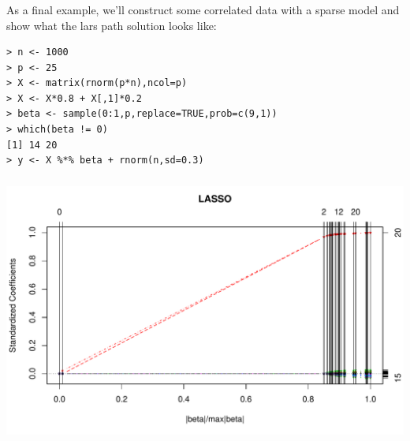 \begin{frame}[fragile] \frametitle{}

As a final example, we'll construct some correlated data with a
sparse model and show what the lars path solution looks like:
\begin{verbatim}
> n <- 1000
> p <- 25
> X <- matrix(rnorm(p*n),ncol=p)
> X <- X*0.8 + X[,1]*0.2
> beta <- sample(0:1,p,replace=TRUE,prob=c(9,1))
> which(beta != 0)
[1] 14 20
> y <- X %*% beta + rnorm(n,sd=0.3)
\end{verbatim}

\end{frame}

\begin{frame}[fragile] \frametitle{}

\begin{center}
\includegraphics[width=\textwidth]{img/fig07.pdf}
\end{center}

\end{frame}













